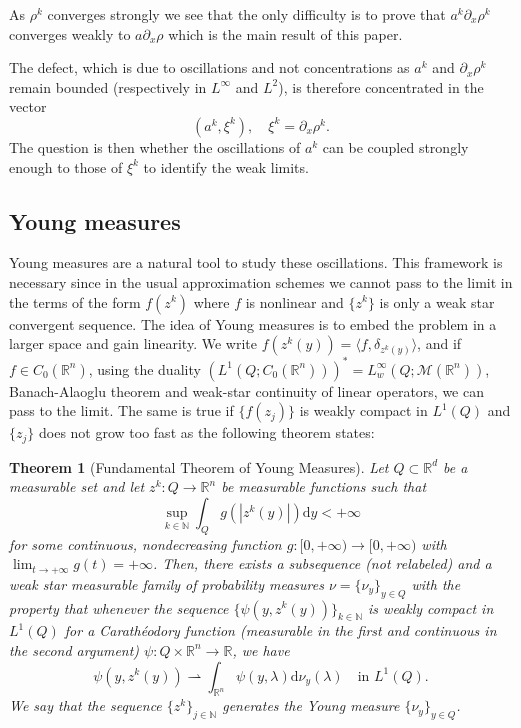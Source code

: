 \documentclass[a4paper,twosided,11pt]{article}
\newcommand{\R}{\mathbb{R}}
\newcommand{\1}{\mathbf{1}}
\theoremstyle{plain}
\newtheorem{thm}{Theorem}[section]
\theoremstyle{remark}
\numberwithin{equation}{section}
\begin{document}
As $\rho^k$ converges strongly we see that the only difficulty is to prove that $a^k\partial_x\rho^k$ converges weakly to $a\partial_x\rho$ which is the main result of this paper.  

The defect, which is due to oscillations and not concentrations as $a^k$ and $\partial_x \rho^k$ remain bounded (respectively in $L^\infty$ and $L^2$), is therefore concentrated in the vector
$$
(a^k,\xi^k), \quad \xi^k=\partial_x\rho^k.
$$
The question is then whether the oscillations of $a^k$ can be coupled strongly enough to those of $\xi^k$ to identify the weak limits.

\subsection{Young measures}

Young measures are a natural tool to study these oscillations. This framework is necessary since in the usual approximation schemes we  cannot pass to the limit in the terms of the form $f(z^k)$ where $f$ is nonlinear and $\{z^k\}$ is only a weak star convergent sequence. The idea of Young measures is to embed the problem in a larger space and gain linearity. We write $f(z^k(y))=\langle f,\delta_{z^k(y)}\rangle$, and if $f\in C_{0}(\R^n)$, using the duality $(L^{1}(Q;C_{0}(\R^n)))^{*}=L^{\infty}_{w}(Q;\mathcal{M}(\R^n))$, Banach-Alaoglu theorem and weak-star continuity of linear operators, we can pass to the limit. The same is true if $\{f(z_j)\}$ is weakly compact in $L^1(Q)$ and $\{z_j\}$ does not grow too fast as the following theorem states:
\begin{thm}[Fundamental Theorem of Young Measures]\label{thm:fund_theorem_YM}
Let $Q\subset\R^{d}$ be a measurable set and let $z^k:Q\to \R^{n}$ be measurable functions such that 
\begin{equation*}
\sup_{k\in\mathbb{N}}\int_{Q}g(|z^k(y)|)\mathrm{d}y<+\infty   
\end{equation*}
for some continuous, nondecreasing function $g:[0,+\infty)\to [0,+\infty)$ with $\lim_{t\to+\infty}g(t)=+\infty$. Then, there exists a subsequence (not relabeled) and a {weak star} measurable family of probability measures $\nu= \{\nu_{y}\}_{y\in Q}$ with the property that whenever the sequence $\{\psi(y, z^k (y))\}_{k\in\mathbb{N}}$ is weakly compact in $L^{1}(Q)$ for a Carathéodory function (measurable in the first and continuous in the second argument) $\psi: Q \times \R^{n}\to \R$, we have
\begin{equation*}
\psi(y,z^k(y))\rightharpoonup\int_{\R^{n}}\psi(y,\lambda) \mathrm{d}\nu_{y}(\lambda)\quad \text{in $L^{1}(Q)$}.     
\end{equation*}
We say that the sequence $\{z^k\}_{j\in\mathbb{N}}$ generates the Young measure $\{\nu_{y}\}_{y\in Q}$.
\end{thm}
\end{document}
